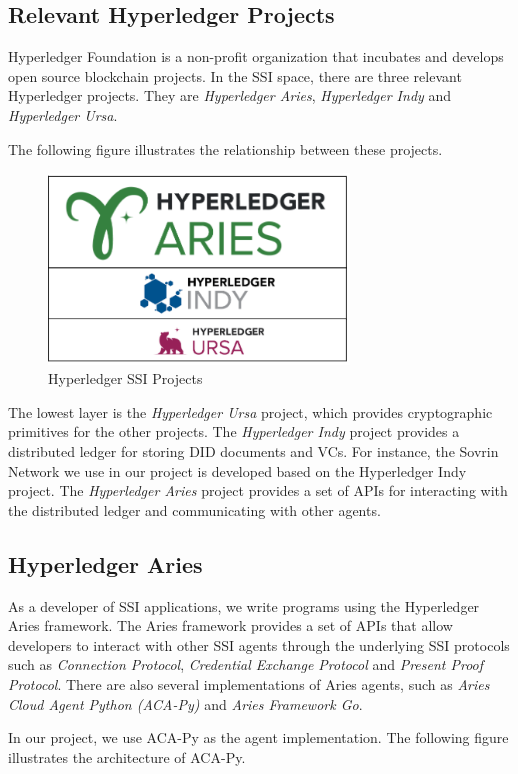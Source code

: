 \documentclass[
]{report}
\begin{document}
\subsection{Relevant Hyperledger Projects}
Hyperledger Foundation is a non-profit organization that incubates and
develops open source blockchain projects. In the SSI space, there are three
relevant Hyperledger projects. They are \emph{Hyperledger Aries},
\emph{Hyperledger Indy} and \emph{Hyperledger Ursa}.

The following figure illustrates the relationship between these projects.

\begin{figure}
\centering
\includegraphics[width=8cm]{eco.png}
\caption{Hyperledger SSI Projects}
\end{figure}

The lowest layer is the \emph{Hyperledger Ursa} project, which provides
cryptographic primitives for the other projects. The \emph{Hyperledger
Indy} project provides a distributed ledger for storing DID documents and
VCs. For instance, the Sovrin Network we use in our project is developed
based on the Hyperledger Indy project. The \emph{Hyperledger Aries}
project provides a set of APIs for interacting with the distributed
ledger and communicating with other agents.

\subsection{Hyperledger Aries}
As a developer of SSI applications, we write programs using the Hyperledger
Aries framework. The Aries framework provides a set of APIs that allow
developers to interact with other SSI agents through the underlying SSI
protocols such as \emph{Connection Protocol}, \emph{Credential Exchange
Protocol} and \emph{Present Proof Protocol}. There are also several
implementations of Aries agents, such as \emph{Aries Cloud Agent
Python (ACA-Py)} and \emph{Aries Framework Go}.

In our project, we use ACA-Py as the agent implementation. The following
figure illustrates the architecture of ACA-Py.
\end{document}
